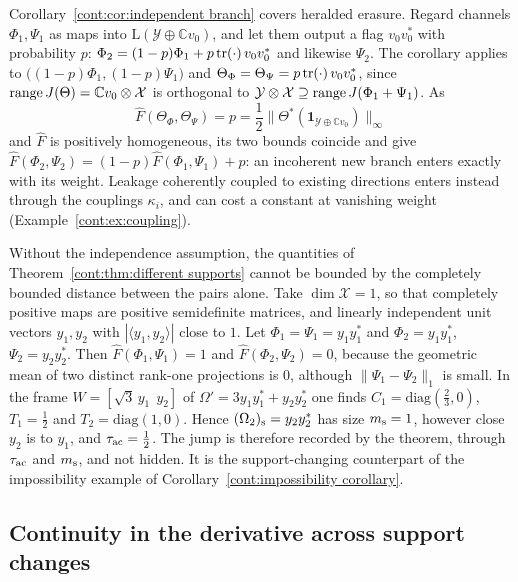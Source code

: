 \begin{remark}\label{cont:rem:phys-erasure}
Corollary~\ref{cont:cor:independent branch} covers heralded erasure. Regard channels $\Phi_1,\Psi_1$ as maps into $\mathrm{L}(\mathcal{Y}\oplus\mathbb{C}v_0)$, and let them output a flag $v_0 v_0^*$ with probability $p$: $\Phi_2=(1-p)\Phi_1+p\operatorname{tr}(\cdot)\,v_0 v_0^*$ and likewise $\Psi_2$. The corollary applies to $\big((1-p)\Phi_1,(1-p)\Psi_1\big)$ and $\Theta_\Phi=\Theta_\Psi=p\operatorname{tr}(\cdot)\,v_0 v_0^*$, since $\operatorname{range} J(\Theta)=\mathbb{C}v_0\otimes\mathcal{X}$ is orthogonal to $\mathcal{Y}\otimes\mathcal{X}\supseteq\operatorname{range} J(\Phi_1+\Psi_1)$. As
\[
\widehat{F}(\Theta_\Phi,\Theta_\Psi)=p=\frac12\|\Theta^*(\mathbf{1}_{\mathcal{Y}\oplus\mathbb{C}v_0})\|_\infty
\]
and $\widehat{F}$ is positively homogeneous, its two bounds coincide and give $\widehat{F}(\Phi_2,\Psi_2)=(1-p)\widehat{F}(\Phi_1,\Psi_1)+p$: an incoherent new branch enters exactly with its weight. Leakage coherently coupled to existing directions \cite{WoodGambetta2018} enters instead through the couplings $\kappa_i$, and can cost a constant at vanishing weight (Example~\ref{cont:ex:coupling}).
\end{remark}

Without the independence assumption, the quantities of Theorem~\ref{cont:thm:different supports} cannot be bounded by the completely bounded distance between the pairs alone. Take $\dim\mathcal{X}=1$, so that completely positive maps are positive semidefinite matrices, and linearly independent unit vectors $y_1,y_2$ with $|\langle y_1,y_2\rangle|$ close to $1$. Let $\Phi_1=\Psi_1=y_1y_1^*$ and $\Phi_2=y_1y_1^*$, $\Psi_2=y_2y_2^*$. Then $\widehat F(\Phi_1,\Psi_1)=1$ and $\widehat F(\Phi_2,\Psi_2)=0$, because the geometric mean of two distinct rank-one projections is $0$, although $\|\Psi_1-\Psi_2\|_1$ is small. In the frame $W=[\sqrt3\,y_1\ \ y_2]$ of $\Omega'=3y_1y_1^*+y_2y_2^*$ one finds $C_1=\mathrm{diag}(\frac23,0)$, $T_1=\frac12$ and $T_2=\mathrm{diag}(1,0)$. Hence $(\Omega_2)_{\rm s}=y_2y_2^*$ has size $m_{\rm s}=1$, however close $y_2$ is to $y_1$, and $\tau_{\rm ac}=\frac12$. The jump is therefore recorded by the theorem, through $\tau_{\rm ac}$ and $m_{\rm s}$, and not hidden. It is the support-changing counterpart of the impossibility example of Corollary~\ref{cont:impossibility corollary}.

\subsection{Continuity in the derivative across support changes}

